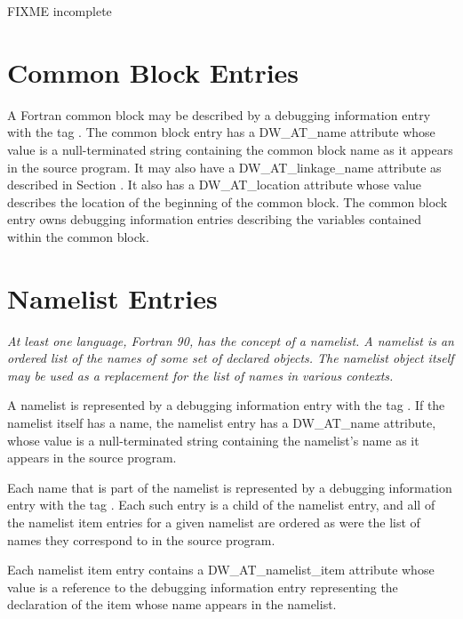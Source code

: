 FIXME incomplete


\section{Common Block Entries}
\label{chap:commonblockentries}
A Fortran common block may be described by a debugging
information entry with the 
tag . 
The
common block entry has a DW\_AT\_name attribute whose value
is a null-terminated string containing the common block
name as it appears in the source program. It may also have a
DW\_AT\_linkage\_name attribute as described in 
Section . 
It
also has a DW\_AT\_location attribute whose value describes the
location of the beginning of the common block. The common
block entry owns debugging information entries describing
the variables contained within the common block.

\section{Namelist Entries}
\label{chap:namelistentries}
\textit{At least one language, Fortran 90, has the concept of a
namelist. A namelist is an ordered list of the names of some
set of declared objects. The namelist object itself may be used
as a replacement for the list of names in various contexts.}

A namelist is represented by a debugging information entry
with the 
tag . 
If the namelist itself has a
name, the namelist entry has a DW\_AT\_name attribute, whose
value is a null-terminated string containing the namelist’s
name as it appears in the source program.

Each name that is part of the namelist is represented
by a debugging information entry with the tag
. 
Each such entry is a child of the
namelist entry, and all of the namelist item entries for a
given namelist are ordered as were the list of names they
correspond to in the source program.

Each namelist item entry contains a DW\_AT\_namelist\_item
attribute whose value is a reference to the debugging
information entry representing the declaration of the item
whose name appears in the namelist.


